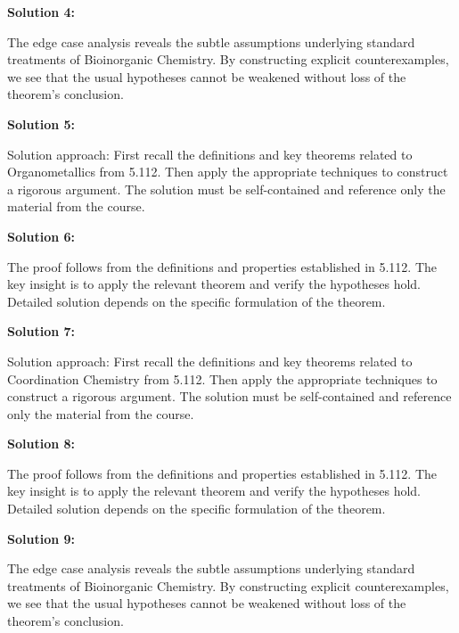 \documentclass[12pt,a4paper]{exam}
\begin{document}
\vspace{0.5cm}

\textbf{Solution 4:}

The edge case analysis reveals the subtle assumptions underlying standard treatments of Bioinorganic Chemistry. By constructing explicit counterexamples, we see that the usual hypotheses cannot be weakened without loss of the theorem's conclusion.

\vspace{0.5cm}

\textbf{Solution 5:}

Solution approach: First recall the definitions and key theorems related to Organometallics from 5.112. Then apply the appropriate techniques to construct a rigorous argument. The solution must be self-contained and reference only the material from the course.

\vspace{0.5cm}

\textbf{Solution 6:}

The proof follows from the definitions and properties established in 5.112. The key insight is to apply the relevant theorem and verify the hypotheses hold. Detailed solution depends on the specific formulation of the theorem.

\vspace{0.5cm}

\textbf{Solution 7:}

Solution approach: First recall the definitions and key theorems related to Coordination Chemistry from 5.112. Then apply the appropriate techniques to construct a rigorous argument. The solution must be self-contained and reference only the material from the course.

\vspace{0.5cm}

\textbf{Solution 8:}

The proof follows from the definitions and properties established in 5.112. The key insight is to apply the relevant theorem and verify the hypotheses hold. Detailed solution depends on the specific formulation of the theorem.

\vspace{0.5cm}

\textbf{Solution 9:}

The edge case analysis reveals the subtle assumptions underlying standard treatments of Bioinorganic Chemistry. By constructing explicit counterexamples, we see that the usual hypotheses cannot be weakened without loss of the theorem's conclusion.
\end{document}
